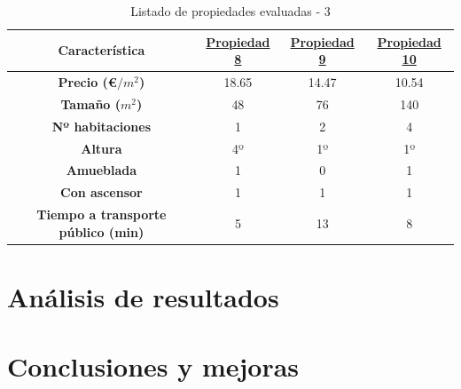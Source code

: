 \documentclass[12pt]{report} %
\begin{document}
    \begin{table}[H]
        \center
        \begin{tabular}{|c|ccc|}
            \hline
            \textbf{Característica} & \href{https://www.idealista.com/inmueble/106330042/}{Propiedad 8} & \href{https://www.idealista.com/inmueble/106355273/}{Propiedad 9} & \href{https://www.idealista.com/inmueble/106107441/}{Propiedad 10} \\
            \hline
            \hline
            \textbf{Precio (€$/m^2$)}                  & 18.65 & 14.47 & 10.54 \\
            \textbf{Tamaño ($m^2$)}                    & 48    & 76    & 140   \\
            \textbf{Nº habitaciones}                   & 1     & 2     & 4     \\
            \textbf{Altura}                            & 4º    & 1º    & 1º    \\
            \textbf{Amueblada}                         & 1     & 0     & 1     \\
            \textbf{Con ascensor}                      & 1     & 1     & 1     \\
            \textbf{Tiempo a transporte público (min)} & 5     & 13    & 8     \\
            \hline
        \end{tabular}
        \caption{Listado de propiedades evaluadas - 3}
    \end{table}

    \chapter{Análisis de resultados}
    \label{chap:resultados}

    \chapter{Conclusiones y mejoras}
    \label{chap:conclusion}



    \clearpage

    \label{chap:bibliography}
    \printbibliography


\end{document}
